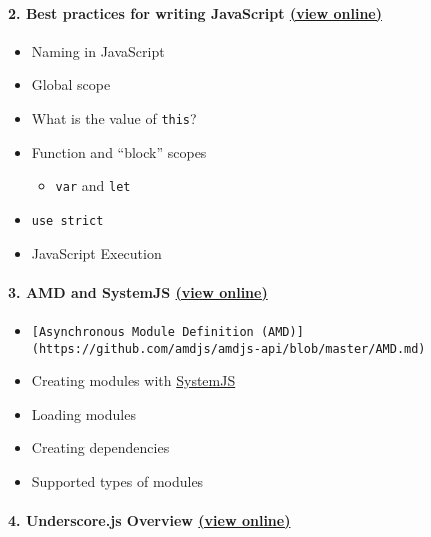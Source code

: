 \paragraph{\texorpdfstring{2. Best practices for writing JavaScript
\href{https://rawgit.com/TelerikAcademy/JavaScript-Applications/master/02.\%20Best\%20practices\%20for\%20writing\%20JavaScript/slides/index.html}{(view
online)}}{2. Best practices for writing JavaScript (view online)}}\label{best-practices-for-writing-javascript-view-online}

\begin{itemize}
\tightlist
\item
  Naming in JavaScript
\item
  Global scope
\item
  What is the value of \texttt{this}?
\item
  Function and ``block'' scopes

  \begin{itemize}
  \tightlist
  \item
    \texttt{var} and \texttt{let}
  \end{itemize}
\item
  \texttt{use\ strict}
\item
  JavaScript Execution
\end{itemize}

\paragraph{\texorpdfstring{3. AMD and SystemJS
\href{https://rawgit.com/TelerikAcademy/JavaScript-Applications/master/03.\%20AMD\%20and\%20SystemJS/slides/index.html}{(view
online)}}{3. AMD and SystemJS (view online)}}\label{amd-and-systemjs-view-online}

\begin{itemize}
\item
\begin{verbatim}
[Asynchronous Module Definition (AMD)](https://github.com/amdjs/amdjs-api/blob/master/AMD.md)
\end{verbatim}
\item
  Creating modules with
  \href{https://github.com/systemjs/systemjs}{SystemJS}
\item
  Loading modules
\item
  Creating dependencies
\item
  Supported types of modules
\end{itemize}

\paragraph{\texorpdfstring{4. Underscore.js Overview
\href{https://rawgit.com/TelerikAcademy/JavaScript-Applications/master/04.\%20Underscore.js\%20overview/slides/index.html}{(view
online)}}{4. Underscore.js Overview (view online)}}\label{underscore.js-overview-view-online}

